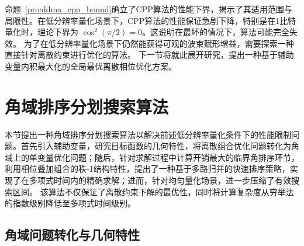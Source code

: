 命题~\ref{pro:ddma_cpp_bound}确立了CPP算法的性能下界，揭示了其适用范围与局限性。在低分辨率量化场景下，CPP算法的性能保证急剧下降，特别是在1比特量化时，理论下界为 $\cos^2(\pi/2)=0$。这说明在最坏的情况下，算法可能完全失效。
为了在低分辨率量化场景下仍然能获得可观的波束赋形增益，需要探索一种直接针对离散约束进行优化的算法。
下一节将就此展开研究，提出一种基于辅助变量内积最大化的全局最优离散相位优化方案。


\section{角域排序分划搜索算法}\label{sec:ddma_adsps}

本节提出一种角域排序分划搜索算法以解决前述低分辨率量化条件下的性能限制问题。首先引入辅助变量，研究目标函数的几何特性，将离散组合优化问题转化为角域上的单变量优化问题；随后，针对求解过程中计算开销最大的临界角排序环节，利用相位叠加组合的秩-1结构特性，提出了一种基于多路归并的快速排序策略，实现了在多项式时间内的精确求解；进而，针对均匀量化场景，进一步压缩了有效搜索区间。
该算法不仅保证了离散约束下解的最优性，同时将计算复杂度从穷举法的指数级别降低至多项式时间级别。


\subsection{角域问题转化与几何特性}

